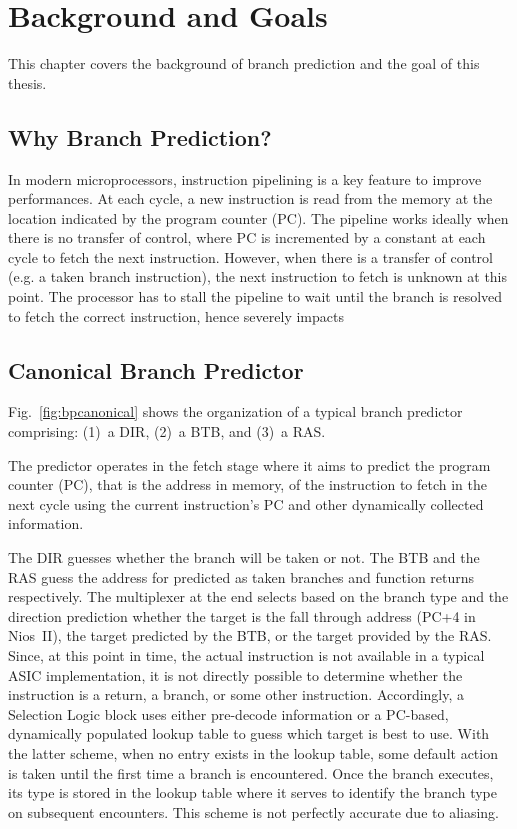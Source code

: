 \chapter{Background and Goals}
This chapter covers the background of branch prediction and the goal of this thesis. 

\section{Why Branch Prediction?}
In modern microprocessors, instruction pipelining is a key feature to improve performances. At each cycle, a new instruction is read from the memory at the location indicated by the program counter (PC). The pipeline works ideally when there is no transfer of control, where PC is incremented by a constant at each cycle to fetch the next instruction. However, when there is a transfer of control (e.g. a taken branch instruction), the next instruction to fetch is unknown at this point. The processor has to stall the pipeline to wait until the branch is resolved to fetch the correct instruction, hence severely impacts









\section{Canonical Branch Predictor}
Fig.~\ref{fig:bpcanonical} shows the organization of a typical branch predictor comprising: (1)~a DIR, (2)~a BTB, and (3)~a RAS.  

The predictor operates in the fetch stage where it aims to predict the program counter (PC), that is the address in memory, of the instruction to fetch in the next cycle using the current instruction's PC and other dynamically collected information. 

The DIR guesses whether the branch will be taken or not. The BTB and the RAS guess the address for  predicted as taken branches and function returns respectively. The multiplexer at the end selects based on the branch type and the direction prediction whether the target is the fall through address (PC+4 in Nios~II), the target predicted by the BTB, or the target provided by the RAS. Since, at this point in time, the actual instruction is not available in a typical ASIC implementation, it is not directly possible to determine whether the instruction is a return, a branch, or some other instruction. Accordingly, a Selection Logic block uses either pre-decode information or a PC-based, dynamically populated lookup table to guess which target is best to use. With the latter scheme, when no entry exists in the lookup table, some default action is taken until the first time a branch is encountered. Once the branch executes, its type is stored in the lookup table where it serves to identify the branch type on subsequent encounters. This scheme is not perfectly accurate due to aliasing.


